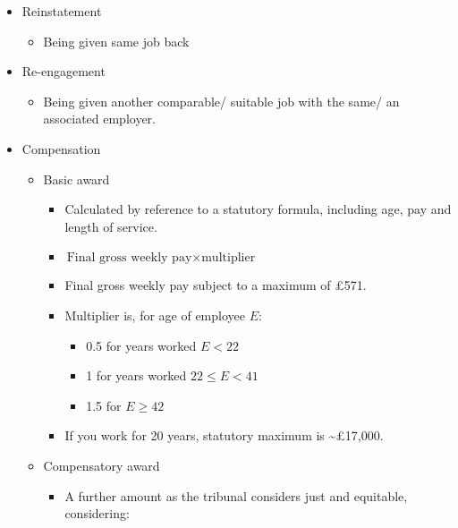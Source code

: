 \documentclass[
]{article}
\providecommand{\tightlist}{%
  \setlength{\itemsep}{0pt}\setlength{\parskip}{0pt}}
\begin{document}
\begin{itemize}
\tightlist
\item
  Reinstatement

  \begin{itemize}
  \tightlist
  \item
    Being given same job back
  \end{itemize}
\item
  Re-engagement

  \begin{itemize}
  \tightlist
  \item
    Being given another comparable/ suitable job with the same/ an
    associated employer.
  \end{itemize}
\item
  Compensation

  \begin{itemize}
  \tightlist
  \item
    Basic award

    \begin{itemize}
    \tightlist
    \item
      Calculated by reference to a statutory formula, including age, pay
      and length of service.
    \item
      \(\text{Final gross weekly pay} \times \text{multiplier}\)
    \item
      Final gross weekly pay subject to a maximum of £571.
    \item
      Multiplier is, for age of employee \(E\):

      \begin{itemize}
      \tightlist
      \item
        0.5 for years worked \(E<22\)
      \item
        1 for years worked \(22\leq E < 41\)
      \item
        1.5 for \(E \geq 42\)
      \end{itemize}
    \item
      If you work for 20 years, statutory maximum is
      \textasciitilde£17,000.
    \end{itemize}
  \item
    Compensatory award

    \begin{itemize}
    \tightlist
    \item
      A further amount as the tribunal considers just and equitable,
      considering:


\end{itemize}
\end{itemize}
\end{itemize}
\end{document}
